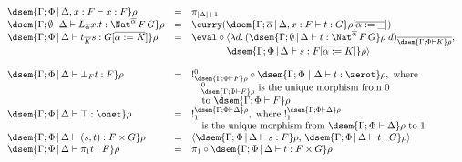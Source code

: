 \documentclass{lmcs}
\theoremstyle{plain}\newtheorem{satz}[thm]{Satz}
\begin{document}
\begin{figure*}
\begin{adjustbox}{varwidth=7.2in, max width=5.8in, fbox, center}
\[\begin{array}{lll}
\dsem{\Gamma;\Phi \,|\, \Delta,x :F \vdash x : F} \rho& = &
\pi_{|\Delta|+1}\\
\dsem{\Gamma;\emptyset \,|\, \Delta \vdash L_{\overline \alpha} x.t :
  \Nat^{\overline 
    \alpha} \,F \,G}\rho & = &  \curry (\dsem{\Gamma;\overline \alpha
  \,|\, \Delta, x : F \vdash t: G}\rho[\overline{\alpha := \_}])\\
\dsem{\Gamma;\Phi \,|\, \Delta \vdash t_{\overline K} s:
  G [\overline{\alpha := K}]}\rho & = & \eval \circ \langle
  \lambda d.\,(\dsem{\Gamma;\emptyset \,|\, \Delta \vdash t :
  \Nat^{\overline{\alpha}} \,F \,G}\rho\; d)_{\overline{\dsem{\Gamma;\Phi
      \vdash K}\rho}},\\ 
 & & \hspace*{0.5in} \dsem{\Gamma;\Phi \,|\,
    \Delta \vdash s: F [\overline{\alpha := K}]}\rho \rangle\\ 
& & \\
\dsem{\Gamma;\Phi \,|\, \Delta \vdash \bot_F t : F} \rho& = &
!^0_{\dsem{\Gamma;\Phi \vdash F}\rho} \circ
  \dsem{\Gamma;\Phi~|~\Delta \vdash t : \zerot}\rho, \mbox{ where } \\
 & & \hspace*{0.1in} !^0_{\dsem{\Gamma;\Phi \vdash F}\rho}
\mbox{ is the unique morphism from } 0\\
 & & \hspace*{0.1in} \mbox{ to } \dsem{\Gamma;\Phi \vdash F}\rho\\
\dsem{\Gamma;\Phi \,|\, \Delta \vdash \top : \onet}\rho & = &
!^{\dsem{\Gamma;\Phi\vdash \Delta}\rho}_1, \mbox{ where }
!^{\dsem{\Gamma;\Phi\vdash \Delta}\rho}_1\\ 
& & \hspace*{0.1in} \mbox{ is the unique morphism from }
\dsem{\Gamma;\Phi\vdash \Delta}\rho \mbox{ to } 1\\ 
\dsem{\Gamma;\Phi \,|\, \Delta \vdash (s,t) : F \times G} \rho& = &
\langle \dsem{\Gamma;\Phi \,|\, \Delta \vdash s: F} \rho,\,
\dsem{\Gamma;\Phi \,|\, \Delta \vdash t : G} \rho\rangle\\
\dsem{\Gamma;\Phi \,|\, \Delta \vdash \pi_1 t : F} \rho& = &
\pi_1 \circ \dsem{\Gamma;\Phi \,|\, \Delta \vdash t : F \times G}\rho\\

\end{array}\]
\end{adjustbox}
\end{figure*}
\end{document}
